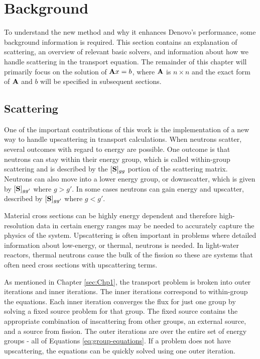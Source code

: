 \section{Background}
To understand the new method and why it enhances Denovo's performance, some background information is required. This section contains an explanation of scattering, an overview of relevant basic solvers, and information about how we handle scattering in the transport equation. The remainder of this chapter will primarily focus on the solution of $\mathbf{A}x = b$, where $\mathbf{A}$ is $n \times n$  and the exact form of $\mathbf{A}$ and $b$ will be specified in subsequent sections.

\subsection{Scattering}
One of the important contributions of this work is the implementation of a new way to handle upscattering in transport calculations. When neutrons scatter, several outcomes with regard to energy are possible. One outcome is that neutrons can stay within their energy group, which is called within-group scattering and is described by the $[\mathbf{S}]_{gg}$ portion of the scattering matrix. Neutrons can also move into a lower energy group, or downscatter, which is given by $[\mathbf{S}]_{gg'}$ where $g > g'$. In some cases neutrons can gain energy and upscatter, described by $[\mathbf{S}]_{gg'}$ where $g < g'$. 

Material cross sections can be highly energy dependent and therefore high-resolution data in certain energy ranges may be needed to accurately capture the physics of the system. Upscattering is often important in problems where detailed information about low-energy, or thermal, neutrons is needed. In light-water reactors, thermal neutrons cause the bulk of the fission so these are systems that often need cross sections with upscattering terms.  

As mentioned in Chapter \ref{sec:Chp1}, the transport problem is broken into outer iterations and inner iterations. The inner iterations correspond to within-group the equations. Each inner iteration converges the flux for just one group by solving a fixed source problem for that group. The fixed source contains the appropriate combination of inscattering from other groups, an external source, and a source from fission.  The outer iterations are over the entire set of energy groups - all of Equations \eqref{eq:group-equations}. If a problem does not have upscattering, the equations can be quickly solved using one outer iteration. 

